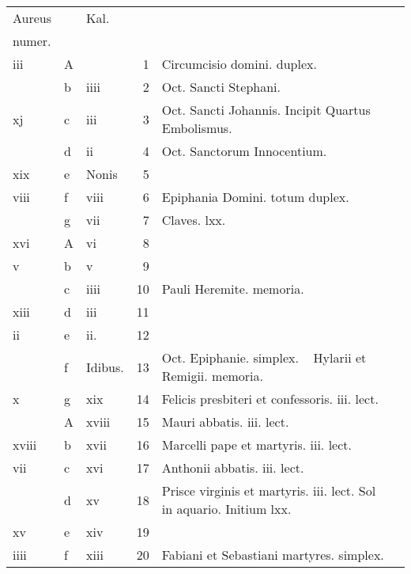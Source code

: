 \documentclass[11pt,openany]{book}
\begin{document}
\begin{center}
\begin{tabular}{l | l | l | r | l r}
\color{Red}Aureus & & \color{Red} Kal. & & & \\
\color{Red}numer. & & & & & \\
\color{Red} iii & \color{Red} A & & 1 & \color{Red} Circumcisio domini. \color{Red} duplex. \\
 & b & \color{Red} iiii & 2 & Oct. Sancti Stephani. & \color{Red} \\
\color{Red} xj & c & \color{Red} iii & 3 & Oct. Sancti Johannis. \qquad \color{Red} Incipit Quartus Embolismus.\\
& d & \color{Red} ii & 4 & \color{Red} Oct. Sanctorum Innocentium. & \color{Red} \\
\color{Red} xix & e & Nonis & 5 & & \color{Red} \\
\color{Red} viii & f & \color{Red} viii & 6 & Epiphania Domini. totum duplex. \\
 & g & \color{Red} vii & 7 & \qquad \color{Red} Claves. lxx. & \\
\color{Red} xvi & \color{Red} A & \color{Red} vi & 8 & & \\
\color{Red} v & b & \color{Red} v & 9 & & \\
 & c & \color{Red} iiii & 10 & Pauli Heremite. \color{Red} memoria. \\
\color{Red} xiii & d & \color{Red} iii & 11 & & \color{Red} \\
\color{Red} ii & e & \color{Red} ii. & 12 & & \color{Red} \\
 & f & Idibus. & 13 & Oct. Epiphanie. \color{Red} simplex. \ \color{black} Hylarii et Remigii. \color{Red} memoria. & \\
\color{Red} x & g & \color{Red} xix & 14 & Felicis presbiteri et confessoris. iii. lect. \\
 & \color{Red} A & \color{Red} xviii & 15 & \color{Red} Mauri abbatis. iii. lect. \\
\color{Red} xviii & b & \color{Red} xvii & 16 & Marcelli pape et martyris. iii. lect. \\
\color{Red} vii & c & \color{Red} xvi & 17 & \color{Red} Anthonii abbatis. iii. lect. \\
 & d & \color{Red} xv & 18 & Prisce virginis et martyris. iii. lect. \qquad \color{Red} Sol in aquario. Initium lxx. \\
\color{Red} xv & e & \color{Red} xiv & 19 & \color{Red} \\
\color{Red} iiii & f & \color{Red} xiii & 20 & Fabiani et Sebastiani martyres. simplex. \\

\end{tabular}
\end{center}
\end{document}
